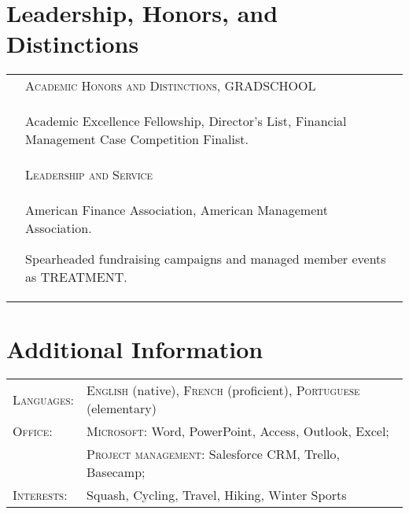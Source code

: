 \documentclass[a4paper,10pt]{article}
\begin{document}
\section{Leadership, Honors, and Distinctions}
\begin{supertabular}{p{3.4cm} p{13.9cm}}

	\textsc{}		 				& \textsc{Academic Honors and Distinctions}, GRADSCHOOL \\
														& \begin{enumerate*}[label =$\diamond$, itemjoin={\newline}]
																\item \footnotesize Academic Excellence Fellowship, Director's List, Financial Management Case Competition Finalist.
																\end{enumerate*} \vspace{2mm} \\

	\textsc{} 						& \textsc{Leadership and Service} \\
														& \begin{enumerate*}[label =$\diamond$, itemjoin={\newline}]
																\item \footnotesize American Finance Association, American Management Association.
																\item \footnotesize  Spearheaded fundraising campaigns and managed member events as TREATMENT.
																\end{enumerate*} \vspace{2mm} \\



\end{supertabular}



\smallskip
\section{Additional Information}
\begin{supertabular}{p{3.4cm} p{13.9cm}}
	\textsc{Languages:}			& \small\textsc{English} (native), \textsc{French} (proficient), \textsc{Portuguese} (elementary) \vspace{1mm} \\

	\textsc{Office:}			& \small\textsc{Microsoft}: \footnotesize Word, PowerPoint, Access, Outlook, Excel; \\
								& \small\textsc{Project management:} \footnotesize Salesforce CRM, Trello, Basecamp; \vspace{1mm} \\

	\textsc{Interests:} 		& \small Squash, Cycling, Travel, Hiking, Winter Sports \\

\end{supertabular}
\end{document}
